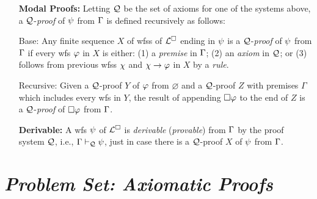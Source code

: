 \documentclass[a4paper, 11pt]{article} %
\begin{document}
\begin{enumerate}[leftmargin=1.2in,itemsep=2pt]
	\item[\bf Modal Proofs:] Letting $\mathcal{Q}$ be the set of axioms for one of the systems above, a $\mathcal{Q}$-\textit{proof} of $\psi$ from $\Gamma$ is defined recursively as follows:
	\item[\sc Base:] Any finite sequence $X$ of wfss of $\mathcal{L}^{\square}$ ending in $\psi$ is a $\mathcal{Q}$-\textit{proof} of $\psi$ from $\Gamma$ if every wfs $\varphi$ in $X$ is either: (1) a \textit{premise} in $\Gamma$; (2) an \textit{axiom} in $\mathcal{Q}$; or (3) follows from previous wfss $\chi$ and $\chi \rightarrow \varphi$ in $X$ by a \textit{rule}.
  \item[\sc Recursive:] Given a $\mathcal{Q}$-proof $Y$ of $\varphi$ from $\varnothing$ and a $\mathcal{Q}$-proof $Z$ with premises $\Gamma$ which includes every wfs in $Y$, the result of appending $\Box\varphi$ to the end of $Z$ is a $\mathcal{Q}$-\textit{proof} of $\Box\varphi$ from $\Gamma$.
	\item[\bf Derivable:] A wfs $\psi$ of $\mathcal{L}^{\square}$ is \textit{derivable} (\textit{provable}) from $\Gamma$ by the proof system $\mathcal{Q}$, i.e., $\Gamma \vdash_{\mathcal{Q}} \psi$, just in case there is a $\mathcal{Q}$-proof $X$ of $\psi$ from $\Gamma$.
\end{enumerate}




\section*{\it Problem Set: Axiomatic Proofs}
\end{document}
